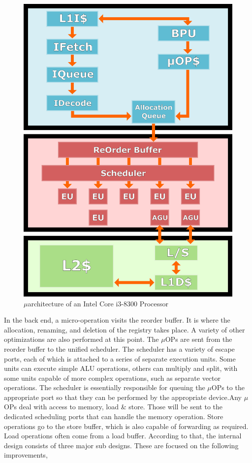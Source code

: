 \documentclass[a4paper,11pt]{article}
\begin{document}
\begin{figure}
	\includegraphics[scale= 0.23]{figures/intuarch}
	\caption{$\mu$architecture of an Intel Core i3-8300 Processor}
\end{figure}
In the back end, a micro-operation visits the reorder buffer. It is where the allocation, renaming, and deletion of the registry takes place. A variety of other optimizations are also performed at this point. The $\mu$OPs are sent from the reorder buffer to the unified scheduler. The scheduler has a variety of escape ports, each of which is attached to a series of separate execution units. Some units can execute simple ALU operations, others can multiply and split, with some units capable of more complex operations, such as separate vector operations. The scheduler is essentially responsible for queuing the $\mu$OPs to the appropriate port so that they can be performed by the appropriate device.Any $\mu$OPs deal with access to memory, load \& store. Those will be sent to the dedicated scheduling ports that can handle the memory operation. Store operations go to the store buffer, which is also capable of forwarding as required. Load operations often come from a load buffer. According to that, the internal design consists of three major sub designs. These are focused on the following improvements, 
\end{document}
